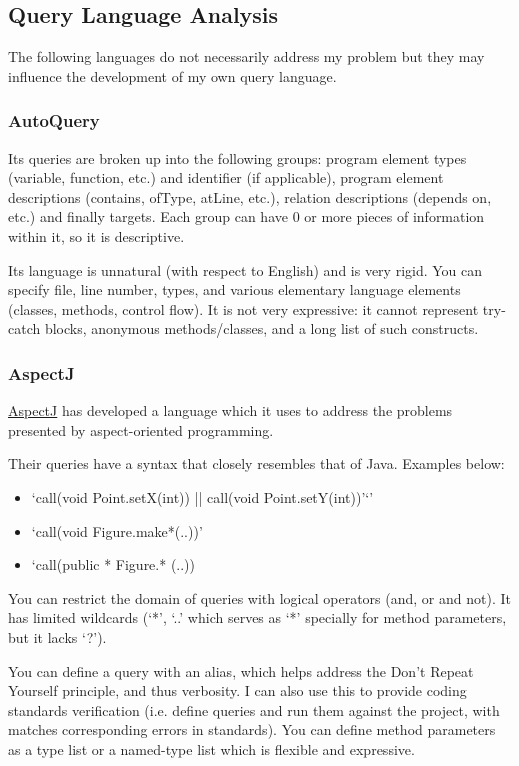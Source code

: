 \documentclass[12pt, letterpaper]{article}
\begin{document}
\subsection{Query Language Analysis}
The following languages do not necessarily address my problem but they may influence the development of my own query language.

\subsubsection{AutoQuery}
\label{sec:AutoQuery}
Its queries are broken up into the following groups: program element types (variable, function, etc.) and identifier (if applicable), program element descriptions (contains, ofType, atLine, etc.), relation descriptions (depends on, etc.) and finally targets.
Each group can have 0 or more pieces of information within it, so it is descriptive.

Its language is unnatural (with respect to English) and is very rigid.
You can specify file, line number, types, and various elementary language elements (classes, methods, control flow).
It is not very expressive: it cannot represent try-catch blocks, anonymous methods/classes, and a long list of such constructs.

\subsubsection{AspectJ}
\href{https://eclipse.org/aspectj/doc/next/progguide/starting-aspectj.html}{AspectJ} has developed a language which it uses to address the problems presented by aspect-oriented programming.  

Their queries have a syntax that closely resembles that of Java. Examples below:
\begin{itemize}
  \item `call(void Point.setX(int)) || call(void Point.setY(int))'`'
  \item `call(void Figure.make*(..))'
  \item `call(public * Figure.* (..))
\end{itemize}

You can restrict the domain of queries with logical operators (and, or and not).
It has limited wildcards (`*', `..' which serves as `*' specially for method parameters, but it lacks `?').

You can define a query with an alias, which helps address the Don't Repeat Yourself principle, and thus verbosity.
I can also use this to provide coding standards verification (i.e. define queries and run them against the project, with matches corresponding errors in standards).
You can define method parameters as a type list or a named-type list which is flexible and expressive.
\end{document}
